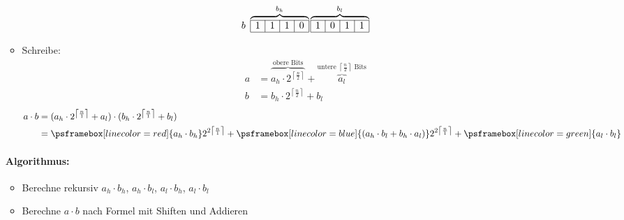 \begin{itemize}
\begin{itemize}
\[                \]
                \[  b\ 
                    \overbrace{
                    \begin{array}{|c|c|c|c|}
                    \cline{1-4}
                     1 & 1 & 1 & 0 \\\cline{1-4}
                    \end{array}
                    }^{b_h}
                    \overbrace{
                    \begin{array}{|c|c|c|c|}
                    \cline{1-4}
                     1 & 0 & 1 & 1 \\\cline{1-4}
                    \end{array}}^{b_l}
                \]
        \item   Schreibe:
                \begin{align*}
                 a &= \overbrace{a_h \cdot 2^{\left\lceil\frac{n}{2}\right\rceil}}^{\text{obere Bits}} + \overbrace{a_l}^{\text{untere $\left\lceil\frac{n}{2}\right\rceil$ Bits}}\\
                 b &= b_h \cdot 2^{\left\lceil\frac{n}{2}\right\rceil} + b_l
                \end{align*}
                \begin{align*}
                 a \cdot b  &= (a_h \cdot 2^{\left\lceil \frac{n}{1} \right\rceil} + a_l) \cdot (b_h \cdot 2^{\left\lceil \frac{n}{1} \right\rceil} + b_l)\\
                            &= \psframebox[linecolor=red]{a_h \cdot b_h} 2^{2 \left\lceil \frac{n}{1} \right\rceil} + 
                                \psframebox[linecolor=blue]{(a_h \cdot b_l + b_h \cdot a_l)} 2^{2 \left\lceil \frac{n}{1} \right\rceil} + \psframebox[linecolor=green]{a_l \cdot b_l}
                \end{align*}
        \end{itemize}
        \paragraph{Algorithmus:}
        \begin{itemize}
        \item   Berechne rekursiv $a_h \cdot b_h$, $a_h \cdot b_l$, $a_l \cdot b_h$, $a_l \cdot b_l$
        \item   Berechne $a \cdot b$ nach Formel mit Shiften und Addieren
        \end{itemize}

\end{itemize}
